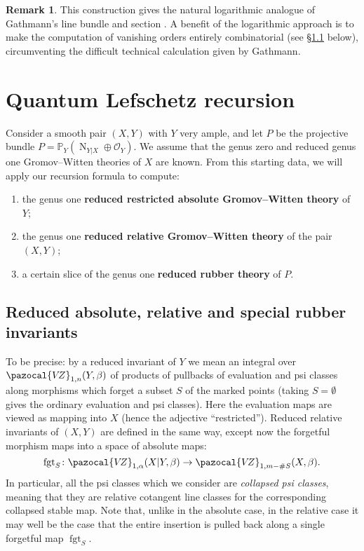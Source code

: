 \documentclass[11pt]{amsart}
\newcommand{\PP}{\mathbb P}
\newcommand{\VZ}{\pazocal{V\!Z}}
\newcommand{\OO}{\mathcal{O}}
\renewcommand{\to}{\rightarrow}
\newcommand{\fgt}{\operatorname{fgt}}
\theoremstyle{definition}
\theoremstyle{definition}
\newtheorem{remark}[thm]{Remark}
\begin{document}
\begin{remark} This construction gives the natural logarithmic analogue of Gathmann's line bundle and section \cite[Construction 2.1]{Ga}. A benefit of the logarithmic approach is to make the computation of vanishing orders entirely combinatorial (see \S \ref{} below), circumventing the difficult technical calculation given by Gathmann. \end{remark}

\newpage

\section{Quantum Lefschetz recursion}
Consider a smooth pair $(X,Y)$ with $Y$ very ample, and let $P$ be the projective bundle $P=\PP_Y(\operatorname{N}_{Y|X} \oplus\OO_Y)$. We assume that the genus zero and reduced genus one Gromov--Witten theories of $X$ are known. From this starting data, we will apply our recursion formula to compute:
\begin{enumerate}
\item the genus one \textbf{reduced restricted absolute Gromov--Witten theory} of $Y$;
\item the genus one \textbf{reduced relative Gromov--Witten theory} of the pair $(X,Y)$;
\item a certain slice of the genus one \textbf{reduced rubber theory} of $P$.
\end{enumerate}

\subsection{Reduced absolute, relative and special rubber invariants} To be precise: by a reduced invariant of $Y$ we mean an integral over $\VZ_{1,n}(Y,\beta)$ of products of pullbacks of evaluation and psi classes along morphisms which forget a subset $S$ of the marked points (taking $S=\emptyset$ gives the ordinary evaluation and psi classes). Here the evaluation maps are viewed as mapping into $X$ (hence the adjective ``restricted''). Reduced relative invariants of $(X,Y)$ are defined in the same way, except now the forgetful morphism maps into a space of absolute maps:
\begin{equation*} \fgt_S \colon \VZ_{1,\alpha}(X|Y,\beta) \to \VZ_{1,m-\#S}(X,\beta).\end{equation*}
In particular, all the psi classes which we consider are \emph{collapsed psi classes}, meaning that they are relative cotangent line classes for the corresponding collapsed stable map. Note that, unlike in the absolute case, in the relative case it may well be the case that the entire insertion is pulled back along a single forgetful map $\fgt_S$.
\end{document}

